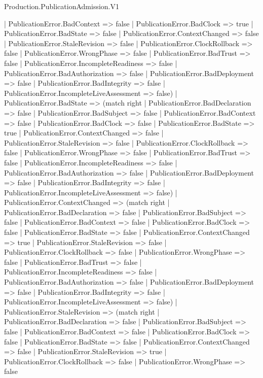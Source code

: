\begin{lexlean}{Production.PublicationAdmission.V1}
\begin{semanticmodule}
{      | PublicationError.BadContext => false
      | PublicationError.BadClock => true
      | PublicationError.BadState => false
      | PublicationError.ContextChanged => false
      | PublicationError.StaleRevision => false
      | PublicationError.ClockRollback => false
      | PublicationError.WrongPhase => false
      | PublicationError.BadTrust => false
      | PublicationError.IncompleteReadiness => false
      | PublicationError.BadAuthorization => false
      | PublicationError.BadDeployment => false
      | PublicationError.BadIntegrity => false
      | PublicationError.IncompleteLiveAssessment => false)
    | PublicationError.BadState => (match right
      | PublicationError.BadDeclaration => false
      | PublicationError.BadSubject => false
      | PublicationError.BadContext => false
      | PublicationError.BadClock => false
      | PublicationError.BadState => true
      | PublicationError.ContextChanged => false
      | PublicationError.StaleRevision => false
      | PublicationError.ClockRollback => false
      | PublicationError.WrongPhase => false
      | PublicationError.BadTrust => false
      | PublicationError.IncompleteReadiness => false
      | PublicationError.BadAuthorization => false
      | PublicationError.BadDeployment => false
      | PublicationError.BadIntegrity => false
      | PublicationError.IncompleteLiveAssessment => false)
    | PublicationError.ContextChanged => (match right
      | PublicationError.BadDeclaration => false
      | PublicationError.BadSubject => false
      | PublicationError.BadContext => false
      | PublicationError.BadClock => false
      | PublicationError.BadState => false
      | PublicationError.ContextChanged => true
      | PublicationError.StaleRevision => false
      | PublicationError.ClockRollback => false
      | PublicationError.WrongPhase => false
      | PublicationError.BadTrust => false
      | PublicationError.IncompleteReadiness => false
      | PublicationError.BadAuthorization => false
      | PublicationError.BadDeployment => false
      | PublicationError.BadIntegrity => false
      | PublicationError.IncompleteLiveAssessment => false)
    | PublicationError.StaleRevision => (match right
      | PublicationError.BadDeclaration => false
      | PublicationError.BadSubject => false
      | PublicationError.BadContext => false
      | PublicationError.BadClock => false
      | PublicationError.BadState => false
      | PublicationError.ContextChanged => false
      | PublicationError.StaleRevision => true
      | PublicationError.ClockRollback => false
      | PublicationError.WrongPhase => false
}
\end{semanticmodule}
\end{lexlean}
